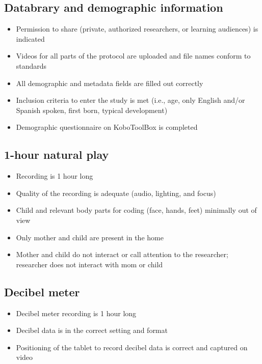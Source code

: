 \documentclass[
  12pt,
]{book}
\providecommand{\tightlist}{%
  \setlength{\itemsep}{0pt}\setlength{\parskip}{0pt}}
\begin{document}
\hypertarget{databrary-and-demographic-information}{%
\subsection{Databrary and demographic information}\label{databrary-and-demographic-information}}

\begin{itemize}
\tightlist
\item
  Permission to share (private, authorized researchers, or learning audiences) is indicated
\item
  Videos for all parts of the protocol are uploaded and file names conform to standards
\item
  All demographic and metadata fields are filled out correctly
\item
  Inclusion criteria to enter the study is met (i.e., age, only English and/or Spanish spoken, first born, typical development)
\item
  Demographic questionnaire on KoboToolBox is completed
\end{itemize}

\hypertarget{hour-natural-play}{%
\subsection{1-hour natural play}\label{hour-natural-play}}

\begin{itemize}
\tightlist
\item
  Recording is 1 hour long
\item
  Quality of the recording is adequate (audio, lighting, and focus)
\item
  Child and relevant body parts for coding (face, hands, feet) minimally out of view
\item
  Only mother and child are present in the home
\item
  Mother and child do not interact or call attention to the researcher; researcher does not interact with mom or child
\end{itemize}

\hypertarget{decibel-meter-1}{%
\subsection{Decibel meter}\label{decibel-meter-1}}

\begin{itemize}
\tightlist
\item
  Decibel meter recording is 1 hour long
\item
  Decibel data is in the correct setting and format
\item
  Positioning of the tablet to record decibel data is correct and captured on video
\end{itemize}
\end{document}
